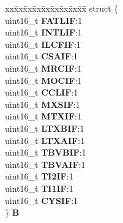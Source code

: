 \begin{DoxyCompactItemize}
\begin{tabbing}
\end{tabbing}\item 
\mbox{\label{unionuPIFR0_a97c6149e8a01ff65b26f275b48adf1c2}} 
\begin{tabbing}
xx\=xx\=xx\=xx\=xx\=xx\=xx\=xx\=xx\=\kill
struct \{\\
\>uint16\_t {\bfseries FATLIF}:1\\
\>uint16\_t {\bfseries INTLIF}:1\\
\>uint16\_t {\bfseries ILCFIF}:1\\
\>uint16\_t {\bfseries CSAIF}:1\\
\>uint16\_t {\bfseries MRCIF}:1\\
\>uint16\_t {\bfseries MOCIF}:1\\
\>uint16\_t {\bfseries CCLIF}:1\\
\>uint16\_t {\bfseries MXSIF}:1\\
\>uint16\_t {\bfseries MTXIF}:1\\
\>uint16\_t {\bfseries LTXBIF}:1\\
\>uint16\_t {\bfseries LTXAIF}:1\\
\>uint16\_t {\bfseries TBVBIF}:1\\
\>uint16\_t {\bfseries TBVAIF}:1\\
\>uint16\_t {\bfseries TI2IF}:1\\
\>uint16\_t {\bfseries TI1IF}:1\\
\>uint16\_t {\bfseries CYSIF}:1\\
\} {\bfseries B}\\


\end{tabbing}
\end{DoxyCompactItemize}
